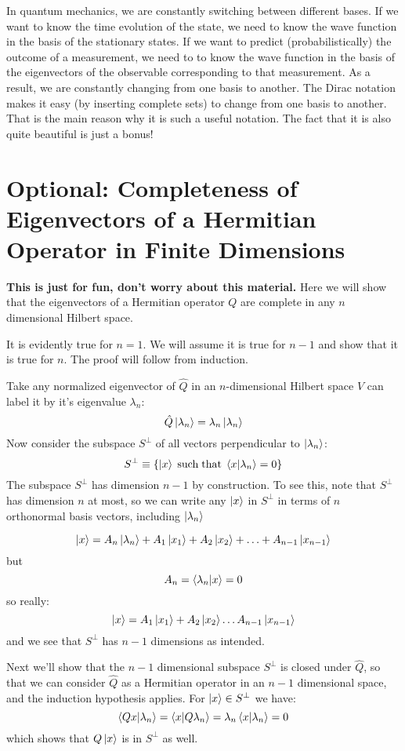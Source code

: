 \documentclass[12pt]{book}
\begin{document}
In quantum mechanics, we are constantly switching between different bases.  If we want to know the time evolution of the state, we need to know the wave function in the basis of the stationary states.  If we want to predict (probabilistically) the outcome of a measurement, we need to to know the wave function in the basis of the eigenvectors of the observable corresponding to that measurement.  As a result, we are constantly changing from one basis to another.  The Dirac notation makes it easy (by inserting complete sets) to change from one basis to another.  That is the main reason why it is such a useful notation.  The fact that it is also quite beautiful is just a bonus!

\section{Optional:  Completeness of Eigenvectors of a Hermitian Operator in Finite Dimensions}

{\bf This is just for fun, don't worry about this material.}  Here we
will show that the eigenvectors of a Hermitian operator $Q$ are
complete in any $n$ dimensional Hilbert space.

It is evidently true for $n=1$.  We will assume it is true for $n-1$ and show that it is true for $n$.  The proof will follow from induction.

Take any normalized eigenvector of $\hat{Q}$ in an $n$-dimensional Hilbert space $V$ can label it by it's eigenvalue $\lambda_n$:
$$\hat{Q}\ket{\lambda_n} = \lambda_n \ket{\lambda_n}$$
Now consider the subspace $S^\perp$ of all vectors perpendicular to $\ket{\lambda_n}$:
$$S^\perp \equiv \{ \ket{x} \; {\rm such \; that} \; \braket{x|\lambda_n}=0 \}$$
The subspace $S^\perp$ has dimension $n-1$ by construction.  To see
this, note that $S^\perp$ has dimension $n$ at most, so we can write
any $\ket{x}$ in $S^\perp$ in terms of $n$ orthonormal basis vectors, including $\ket{\lambda_n}$

$$\ket{x} = A_n \ket{\lambda_n} + A_1 \ket{x_1} + A_2 \ket{x_2} + \ldots  + A_{n-1} \ket{x_{n-1}}$$
but
$$A_n = \braket{\lambda_n|x} = 0$$
so really:
$$\ket{x} = A_1 \ket{x_1} + A_2 \ket{x_2} \ldots A_{n-1} \ket{x_{n-1}}$$
and we see that $S^\perp$ has $n-1$ dimensions as intended.

Next we'll show that the $n-1$ dimensional subspace $S^\perp$ is closed under $\hat{Q}$, so that 
we can consider $\hat{Q}$ as a Hermitian operator in an $n-1$ dimensional space, and the induction hypothesis applies.  For $\ket{x} \in S^\perp$ we have:
$$\braket{Qx|\lambda_n} = \braket{x| Q\lambda_n} = \lambda_n \braket{x|\lambda_n} = 0$$
which shows that $Q\ket{x}$ is in $S^\perp$ as well.  
\end{document}
